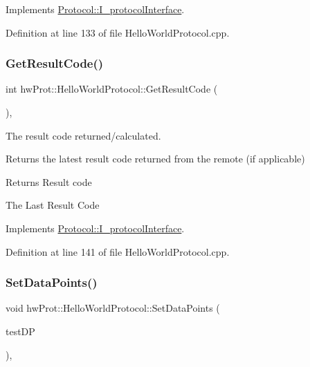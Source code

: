 Implements \mbox{\hyperlink{classProtocol_1_1I__protocolInterface_ac55c6c5aa39aa7340c4e74c0ad5ec04e}{Protocol\+::\+I\+\_\+protocol\+Interface}}.



Definition at line 133 of file Hello\+World\+Protocol.\+cpp.

\mbox{\label{classhwProt_1_1HelloWorldProtocol_a90d21e61e3444d0e2265d3b11dcbc74c}} 
\subsubsection{\texorpdfstring{GetResultCode()}{GetResultCode()}}
{\footnotesize\ttfamily int hw\+Prot\+::\+Hello\+World\+Protocol\+::\+Get\+Result\+Code (\begin{DoxyParamCaption}{ }\end{DoxyParamCaption})\hspace{0.3cm}{\ttfamily [override]}, {\ttfamily [virtual]}}



The result code returned/calculated. 

Returns the latest result code returned from the remote (if applicable)

\begin{DoxyReturn}{Returns}
Result code

The Last Result Code 
\end{DoxyReturn}


Implements \mbox{\hyperlink{classProtocol_1_1I__protocolInterface_a3406495239b3685f089b62a3a34612bc}{Protocol\+::\+I\+\_\+protocol\+Interface}}.



Definition at line 141 of file Hello\+World\+Protocol.\+cpp.

\mbox{\label{classhwProt_1_1HelloWorldProtocol_a5946ebe778fcb8dd0136779503a61f82}} 
\subsubsection{\texorpdfstring{SetDataPoints()}{SetDataPoints()}}
{\footnotesize\ttfamily void hw\+Prot\+::\+Hello\+World\+Protocol\+::\+Set\+Data\+Points (\begin{DoxyParamCaption}\item[{\mbox{\hyperlink{structtestAnalyser2_1_1dataPoint}{test\+Analyser2\+::data\+Point}}}]{test\+DP }\end{DoxyParamCaption})\hspace{0.3cm}{\ttfamily [override]}, {\ttfamily [virtual]}}



